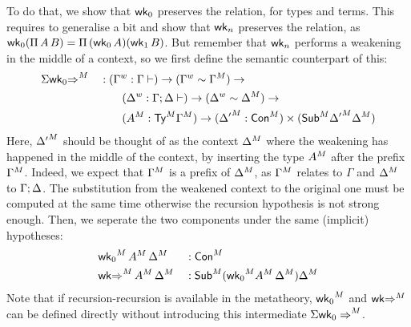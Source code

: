   To do that, we show that $\wkO$ preserves the relation, for types and terms.
  This requires to generalise a bit and show that $\wk_n$ preserves the relation,
  as $\wk_0(\Pi\,A\,B)=\Pi\,(\wk_0\,A)(\wk_1\,B)$.
  But remember that $\wk_n$ performs a weakening in the middle of a context, so
  we first define the semantic counterpart of this:
\begin{alignat*}{5}
  & \model{\Sigma\wkO{\Rightarrow}}  && :
  (\wf{\Gamma} : \Gamma \vdash) \ra
  (\wf\Gamma \sim \model{\Gamma}) \ra
  \\
  & && \qquad
  (\wf{\Delta} : \Gamma\merge\Delta \vdash) \ra
  (\wf\Delta \sim \model{\Delta}) \ra
  \\ &&& \qquad
  (\model{A} : \model\Ty\model\Gamma)\ra
  (\model{\Delta'} : \model{\Con}) \times (\model{\Sub}\model{\Delta'}{\model{\Delta}})
\end{alignat*}
Here, $\model{\Delta'}$ should be thought of as the context $\model\Delta$ where
the weakening has happened in the middle of the context, by inserting the type
$\model{A}$ after the prefix $\model{\Gamma}$. Indeed, we expect that
$\model{\Gamma}$ is a prefix of $\model{\Delta}$, as $\model{\Gamma}$ relates to
$\Gamma$ and $\model{\Delta}$ to $\Gamma\merge\Delta$.
The substitution from the weakened context to the original one must
be computed at the same time otherwise the recursion hypothesis is not strong enough.
Then, we seperate the two components under the same (implicit) hypotheses:
\begin{alignat*}{5}
  & \model{\wkO}\,\model{A}\,\model\Delta  && :
   \model{\Con}
   \\
  & \model{\wk{\Rightarrow}}\,\model{A}\,\model\Delta  && :
   \model{\Sub}(\model{\wkO}\model{A}\,\model\Delta)\model\Delta
\end{alignat*}
Note that if recursion-recursion is available in the metatheory, $\model\wkO$
and $\wk\model{\Rightarrow}$ can be defined directly without introducing this
intermediate $\model{\Sigma\wkO\Rightarrow}$.


